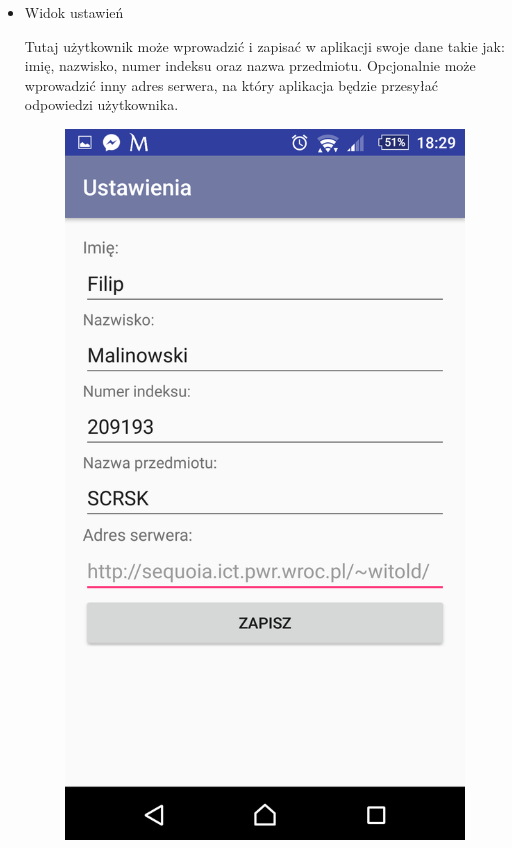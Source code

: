 \documentclass{report}
\begin{document}
\begin{itemize}
			\pagebreak
			
			\item Widok ustawień\\
			\begin{minipage}{0.45\textwidth}
			Tutaj użytkownik może wprowadzić i zapisać w aplikacji swoje dane takie jak: imię, nazwisko, numer indeksu oraz nazwa przedmiotu. Opcjonalnie może wprowadzić inny adres serwera, na który aplikacja będzie przesyłać odpowiedzi użytkownika.
			\end{minipage}
			\begin{minipage}{0.5\textwidth}
				\begin{figure}[H]
					\begin{center}
					\includegraphics[scale=0.1]{widok_ustawien}
					\end{center}
				\end{figure}
			\end{minipage} \hfill
			

\end{itemize}
\end{document}
